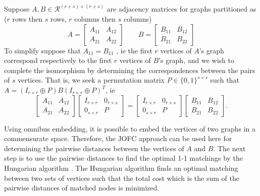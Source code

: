 \documentclass[11pt]{article} %
\begin{document}
Suppose $A,B \in \mathcal{R}^{(r+s)\times (r+s)}$ are adjacency matrices for graphs 
 partitioned as ($r$ rows then $s$ rows, $r$ columns then $s$ columns)
\[  A =\left [
\begin{array}{cc} A_{11} & A_{12} \\ A_{21} & A_{22} \end{array} \right ]
\ \ \ \ \ \ \ \ \ B =\left [
\begin{array}{cc} B_{11} & B_{12} \\ B_{21} & B_{22} \end{array} \right ]
\]
To simplify  suppose that $A_{11}=B_{11}$ , ie the first $r$ vertices
of $A$'s graph correspond respectively to the first $r$ vertices of $B$'s graph,
and we wish to complete the isomorphism by determining the correspondences between the pairs of $s$ vertices. 
That is, we seek a permutation matrix $P \in \{0,1\}^{s \times s}$ such that $A=(I_{r \times r}
\oplus P)B(I_{r \times r} \oplus P)^T$, ie
 \[
 \left [
\begin{array}{cc} A_{11} & A_{12} \\ A_{21} & A_{22} \end{array}
\right ]
\left [
\begin{array}{cc} I_{r \times r} & 0_{r \times s} \\ 0_{s \times r} & P \end{array}
\right ]
=
\left [
\begin{array}{cc} I_{r \times r} & 0_{r \times s} \\ 0_{s \times r} & P \end{array}
\right ]
\left [
\begin{array}{cc} B_{11} & B_{12} \\ B_{21} & B_{22} \end{array}
\right ] .
\]

Using omnibus  embedding, it is possible to embed the vertices of two graphs in a commensurate space.
Therefore, the JOFC approach can be used here for determining the pairwise distances between  the vertices of $A$ and $B$.
The next step is to use the pairwise distances to find the optimal 1-1 matchings by the Hungarian algorithm \cite{Hung-algo}. The Hungarian algorithm finds an optimal matching between two sets of vertices such that the total  cost which is the sum of the pairwise distances of matched nodes is minimized.
 
\end{document}
